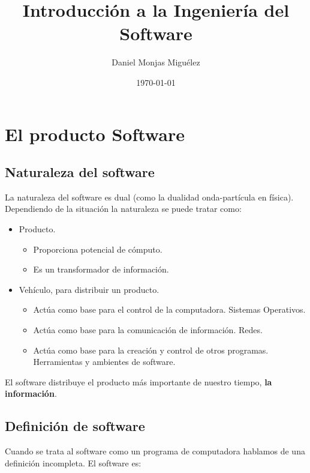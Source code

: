 \documentclass{article}
\title{Introducción a la Ingeniería del Software}
\author{Daniel Monjas Miguélez}
\date{\today}
\begin{document}
\maketitle

\newpage

\tableofcontents

\newpage

\section{El producto Software}
\subsection{Naturaleza del software}
La naturaleza del software es dual (como la dualidad onda-partícula en física). Dependiendo de la situación la naturaleza se puede tratar como:

\begin{itemize}
\item Producto.
	
	\begin{itemize}
	\item Proporciona potencial de cómputo.
	
	\item Es un transformador de información.
	\end{itemize}

\item Vehículo, para distribuir un producto.

	\begin{itemize}
	\item Actúa como base para el control de la computadora. Sistemas Operativos.
	
	\item Actúa como base para la comunicación de información. Redes.
	
	\item Actúa como base para la creación y control de otros programas. Herramientas y ambientes de software.
	\end{itemize}
\end{itemize}

El software distribuye el producto más importante de nuestro tiempo, \textbf{la información}.

\subsection{Definición de software}
Cuando se trata al software como un programa de computadora hablamos de una definición incompleta. El software es:
\end{document}
